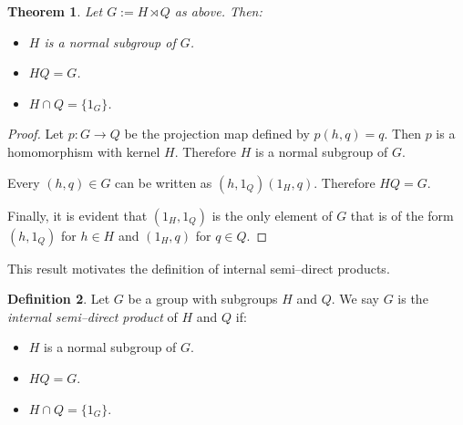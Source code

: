 \documentclass[12pt]{article}
\newcommand{\0}{\bf{0}}
\newcommand{\<}{\langle}
\renewcommand{\>}{\rangle}
\newcommand{\lra}{\longrightarrow}
\newcommand{\intersect}{\cap}
\newcommand{\semidirect}{\rtimes}
\newtheorem{theorem}{Theorem}
\theoremstyle{definition}
\newtheorem{definition}[theorem]{Definition}
\begin{document}
\begin{theorem}\label{ext-to-int}
Let $G := H \semidirect Q$ as above. Then:
\begin{itemize}
\item $H$ is a normal subgroup of $G$.
\item $HQ = G$.
\item $H \intersect Q = \{1_G\}$.
\end{itemize}
\end{theorem}
\begin{proof}
Let $p: G \lra Q$ be the projection map defined by $p(h,q) = q$. Then
$p$ is a homomorphism with kernel $H$. Therefore $H$ is a normal
subgroup of $G$.

%

Every $(h,q) \in G$ can be written as $(h,1_Q) (1_H,q)$. Therefore $HQ
= G$.

Finally, it is evident that $(1_H,1_Q)$ is the only element of $G$
that is of the form $(h,1_Q)$ for $h \in H$ and $(1_H,q)$ for $q \in
Q$.
\end{proof}

This result motivates the definition of internal semi--direct
products.

\begin{definition}
Let $G$ be a group with subgroups $H$ and $Q$. We say $G$ is the {\em
internal semi--direct product} of $H$ and $Q$ if:
\begin{itemize}
\item $H$ is a normal subgroup of $G$.
\item $HQ = G$.
\item $H \intersect Q = \{1_G\}$.
\end{itemize}
\end{definition}
\end{document}
